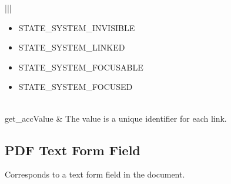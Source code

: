 \documentclass[letterpaper,12pt,english,openany,oneside]{sphinxmanual}
\begin{document}
\begin{savenotes}
\begin{tabular}[t]{|*{2}{|}}
\begin{itemize}
\item {} 
STATE\_SYSTEM\_INVISIBLE

\item {} 
STATE\_SYSTEM\_LINKED

\item {} 
STATE\_SYSTEM\_FOCUSABLE

\item {} 
STATE\_SYSTEM\_FOCUSED

\end{itemize}
\\
\hline
get\_accValue
&
The value is a unique identifier for each link.
\\
\hline
\end{tabular}
\par
\sphinxattableend\end{savenotes}




\subsection{PDF Text Form Field}
\label{\detokenize{MSAA_PDF:pdf-text-form-field}}
Corresponds to a text form field in the document.
\end{document}
